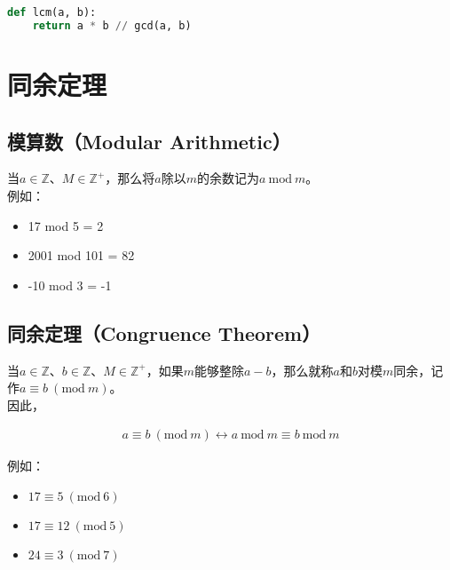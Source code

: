 \vspace{0.5cm}


\begin{lstlisting}[language=Python]
def lcm(a, b):
    return a * b // gcd(a, b)
\end{lstlisting}

\newpage

\section{同余定理}

\subsection{模算数（Modular Arithmetic）}

当$ a \in \mathbb{Z} $、$ M \in \mathbb{Z^+} $，那么将$ a $除以$ m $的余数记为$ a\ \text{mod}\ m $。\\

例如：

\begin{itemize}
    \item 17 mod 5 = 2
    \item 2001 mod 101 = 82
    \item -10 mod 3 = -1
\end{itemize}

\vspace{0.5cm}

\subsection{同余定理（Congruence Theorem）}

当$ a \in \mathbb{Z} $、$ b \in \mathbb{Z} $、$ M \in \mathbb{Z^+} $，如果$ m $能够整除$ a - b $，那么就称$ a $和$ b $对模$ m $同余，记作$ a \equiv b\ (\text{mod}\ m) $。\\

因此，

\vspace{-1cm}

\begin{align}
    a \equiv b\ (\text{mod}\ m) \leftrightarrow a\ \text{mod}\ m \equiv b\ \text{mod}\ m
\end{align}

例如：

\begin{itemize}
    \item $ 17 \equiv 5\ (\text{mod}\ 6) $
    \item $ 17 \equiv 12\ (\text{mod}\ 5) $
    \item $ 24 \equiv 3\ (\text{mod}\ 7) $
\end{itemize}

